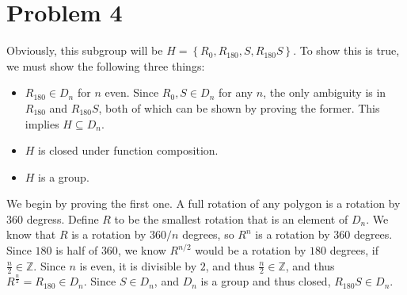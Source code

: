 \documentclass[11pt, letterpaper]{report}
\renewenvironment{solution}[1][]{\begin{setsolution}}{\end{setsolution}}
\begin{document}
\section*{Problem 4}
\begin{solution}
	Obviously, this subgroup will be $H=\left\{R_0,R_{180},S,R_{180}S\right\}$. To show this is true, we must show the following three things:
	\begin{itemize}
		\item $R_{180}\in D_{n}$ for $n$ even. Since $R_0,S\in D_n$ for any $n$, the only ambiguity is in $R_{180}$ and $R_{180}S$, both of which can be shown by proving the former. This implies $H\subseteq D_n$.
		\item $H$ is closed under function composition.
		\item $H$ is a group.
	\end{itemize}
	We begin by proving the first one. A full rotation of any polygon is a rotation by $360$ degress. Define $R$ to be the smallest rotation that is an element of $D_n$. We know that $R$ is a rotation by $360/n$ degrees, so $R^n$ is a rotation by 360 degrees. Since $180$ is half of $360$, we know $R^{n/2}$ would be a rotation by $180$ degrees, if $\frac{n}{2}\in\mathbb{Z}$. Since $n$ is even, it is divisible by $2$, and thus $\frac{n}{2}\in\mathbb{Z}$, and thus $R^{\frac{n}{2}}=R_{180}\in D_n$. Since $S\in D_n$, and $D_n$ is a group and thus closed, $R_{180}S\in D_n$.


\end{solution}
\end{document}
